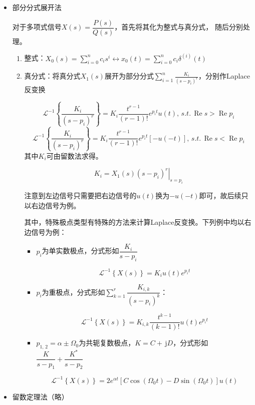 \documentclass[UTF8,fontset=fandol,zihao=5]{ctexart}
\newcommand{\jj}{\,\mathrm{j}}
\newcommand{\LL}{\mathcal{L}}
\newcommand{\RRe}{\operatorname{Re}}
\begin{document}
\begin{methodbox}[【题型】Laplace反变换]
  \begin{itemize}
    \item 部分分式展开法
    
    对于多项式信号$X(s)=\dfrac{P(s)}{Q(s)}$，首先将其化为整式与真分式，
    随后分别处理。
    \begin{enumerate}[label=\arabic*.]
      \item 整式：$X_0(s)=\sum_{i=0}^{n}c_i s^i \longleftrightarrow x_0(t)=\sum_{i=0}^{n}c_i \delta^{(i)}(t)$
      \item 真分式：将真分式$X_1(s)$展开为部分分式$\displaystyle\sum_{i=1}^{n}\frac{K_i}{(s-p_i)^r}$，分别作Laplace反变换
      
      \[
      \LL^{-1}\left\{\frac{K_i}{(s-p_i)^r}\right\} = K_i \frac{t^{r-1}}{(r-1)!} e^{p_i t} u(t),\, s.t.\, \RRe s > \RRe p_i
      \]
      \[
      \LL^{-1}\left\{\frac{K_i}{(s-p_i)^r}\right\} = K_i \frac{t^{r-1}}{(r-1)!} e^{p_i t} [-u(-t)],\, s.t.\, \RRe s < \RRe p_i
      \]
      其中$K_i$可由留数法求得。
      
      \[
      K_i=\left.X_1(s)(s-p_i)^r\right|_{s=p_i}
      \]
      
      注意到左边信号只需要把右边信号的$u(t)$换为$-u(-t)$即可，故后续只以右边信号为例。

      其中，特殊极点类型有特殊的方法来计算Laplace反变换。下列例中均以右边信号为例：
      \begin{itemize}
        \item $p_i$为单实数极点，分式形如$\dfrac{K_i}{s-p_i}$
        
        \[
        \LL^{-1}\left\{X(s)\right\}=K_i u(t) e^{p_i t}
        \]
        
        \item $p_i$为重极点，分式形如$\displaystyle\sum_{k=1}^{r}\dfrac{K_{i,k}}{(s-p_i)^k}$：
        
        \[
        \LL^{-1}\left\{X(s)\right\}=K_{i,k} \dfrac{t^{k-1}}{(k-1)!} u(t) e^{p_i t}
        \]
        
        \item $p_{1,\,2}=\alpha\pm\varOmega_0$为共轭复数极点，$K=C+\jj D$，分式形如$\dfrac{K}{s-p_1}+\dfrac{K^\ast}{s-p_2}$

        \[
        \LL^{-1}\left\{X(s)\right\}=2e^{\alpha t} \left[C\cos (\varOmega_0 t) - D\sin (\varOmega_0 t)\right]  u(t) 
        \]

      \end{itemize}
    \end{enumerate}
    \item 留数定理法（略）
  \end{itemize}
\end{methodbox}
\end{document}
